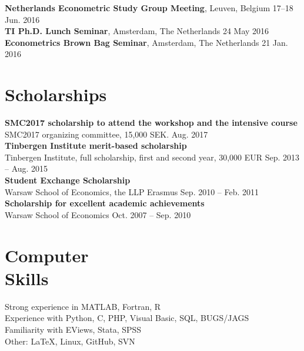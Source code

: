 \documentclass[margin,line]{resume}
\begin{document}
\begin{resume}
    \textbf{ Netherlands Econometric Study Group Meeting}, Leuven, Belgium \hfill 17--18 Jun. 2016\\ 
     \textbf{TI Ph.D. Lunch Seminar}, Amsterdam, The Netherlands \hfill 24 May 2016\\ 
	\textbf{Econometrics Brown Bag Seminar}, Amsterdam, The Netherlands \hfill 21 Jan. 2016\\ 

\vspace{-3mm}


  
   \section{\mysidestyle Scholarships}	
   	\textbf{SMC2017 scholarship to attend the workshop and the intensive course}\\ SMC2017 organizing committee, 15,000 SEK. \hfill Aug. 2017 \vspace{1.5mm} \\   
   	\textbf{Tinbergen Institute merit-based scholarship}\\ Tinbergen Institute, full scholarship, first and second year, 30,000 EUR \hfill Sep. 2013 -- Aug. 2015\vspace{1.5mm} \\   
       \textbf{Student Exchange Scholarship}\\  Warsaw School of Economics, the LLP Erasmus \hfill Sep. 2010 -- Feb. 2011\vspace{1.5mm} \\
       \textbf{Scholarship for excellent academic achievements}\\ Warsaw School of Economics \hfill Oct. 2007 -- Sep. 2010 


   \section{\mysidestyle Computer\\ Skills} 
   Strong experience in MATLAB, Fortran, R   \vspace{1mm}\\
   Experience with Python, C, PHP, Visual Basic, SQL, BUGS/JAGS \vspace{1mm}\\
	Familiarity with EViews, Stata, SPSS \vspace{1mm} \\
	Other: \LaTeX, Linux, GitHub, SVN  


\end{resume}
\end{document}
